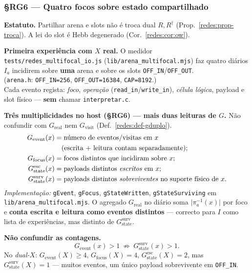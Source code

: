 \documentclass[11pt,a4paper]{article}
\newcommand{\code}[1]{\texttt{\small #1}}
\newcommand{\abs}[1]{\lvert #1\rvert}
\begin{document}
\subsubsection{§RG6 --- Quatro focos sobre estado compartilhado}\label{redes:rg6}

\noindent\textbf{Estatuto.} Partilhar arena e slots não é troca dual $R,R^{\dagger}$
(Prop.~\ref{redes:prop-troca}). A lei do slot é Hebb degenerado
(Cor.~\ref{redes:cor:ow}).

\medskip\noindent\textbf{Primeira experiência com $X$ real.} O medidor
\code{tests/redes\_multifocal\_io.js} (\code{lib/arena\_multifocal.mjs}) faz quatro
diários $I_a$ incidirem sobre \textbf{uma} arena e sobre os slots
\code{OFF\_IN}/\code{OFF\_OUT}.\\
(\code{arena.h}: \code{OFF\_IN=256}, \code{OFF\_OUT=16384}, \code{CAP=8192}.)\\
Cada evento regista: \emph{foco}, \emph{operação}
(\code{read\_in}/\code{write\_in}), \emph{célula lógica}, payload e slot físico
--- \textbf{sem} chamar \code{interpretar.c}.

\medskip\noindent\textbf{Três multiplicidades no host (§RG6) --- mais duas leituras de $G$.}
Não confundir com $G_{\mathrm{real}}$ nem $G_{\mathrm{visit}}$ (Def.~\ref{redes:def-gduplo}).
{\small
\begin{align*}
G_{\mathrm{event}}(x) &= \text{número de eventos/visitas em }x\\
&\quad\text{(escrita + leitura contam separadamente)};\\
G_{\mathrm{focus}}(x) &= \text{focos distintos que incidiram sobre }x;\\
G_{\mathrm{state}}^{\mathrm{esc}}(x) &= \text{payloads distintos \emph{escritos} em }x;\\
G_{\mathrm{state}}^{\mathrm{surv}}(x) &= \text{payloads distintos \emph{sobreviventes}
no suporte físico de }x.
\end{align*}}
\emph{Implementação:} \code{gEvent}, \code{gFocus}, \code{gStateWritten},
\code{gStateSurviving} em \code{lib/arena\_multifocal.mjs}.
O agregado $G_{\mathrm{real}}$ no diário soma $\abs{\pi_a^{-1}(x)}$ por foco e
\textbf{conta escrita e leitura como eventos distintos} --- correcto para $I$ como
lista de experiências, mas distinto de $G_{\mathrm{state}}^{\mathrm{surv}}$.

\medskip\noindent\textbf{Não confundir as contagens.}
\[
G_{\mathrm{event}}(x)>1\ \not\Rightarrow\ G_{\mathrm{state}}^{\mathrm{surv}}(x)>1.
\]
No \emph{dual-$X$}: $G_{\mathrm{event}}(X)\ge4$, $G_{\mathrm{focus}}(X)=4$,
$G_{\mathrm{state}}^{\mathrm{esc}}(X)=2$, mas $G_{\mathrm{state}}^{\mathrm{surv}}(X)=1$
--- muitos eventos, um único payload sobrevivente em \code{OFF\_IN}.
\end{document}
